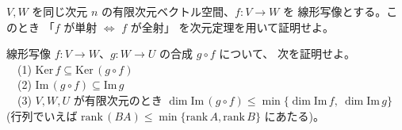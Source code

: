 \begin{mondai}[証明]\label{q:linmap-ex11}
$V, W$ を同じ次元 $n$ の有限次元ベクトル空間、$f : V \to W$ を
線形写像とする。このとき
「$f$ が単射 $\iff$ $f$ が全射」
を次元定理を用いて証明せよ。
\end{mondai}

\begin{mondai}[証明]\label{q:linmap-ex12}
線形写像 $f : V \to W$、$g : W \to U$ の合成 $g \circ f$ について、
次を証明せよ。\\
　(1) $\mathrm{Ker}\,f \subseteq \mathrm{Ker}\,(g \circ f)$\\
　(2) $\mathrm{Im}\,(g \circ f) \subseteq \mathrm{Im}\,g$\\
　(3) $V, W, U$ が有限次元のとき
$\dim \mathrm{Im}\,(g \circ f) \le \min\{\dim \mathrm{Im}\,f,\ \dim \mathrm{Im}\,g\}$
(行列でいえば $\mathrm{rank}\,(BA) \le \min\{\mathrm{rank}\,A,
\mathrm{rank}\,B\}$ にあたる)。
\end{mondai}

